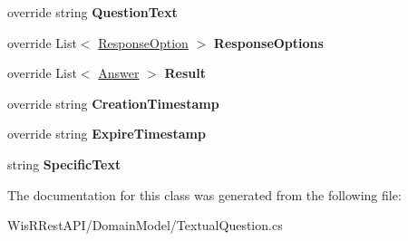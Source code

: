 \begin{DoxyCompactItemize}
\item 
\hypertarget{class_wis_r_1_1_domain_models_1_1_textual_question_ace93eb6c7a11c5a107615c642c296501}{}override string {\bfseries Question\+Text}\label{class_wis_r_1_1_domain_models_1_1_textual_question_ace93eb6c7a11c5a107615c642c296501}

\item 
\hypertarget{class_wis_r_1_1_domain_models_1_1_textual_question_a4751dd095120537c75e97a861bfb423d}{}override List$<$ \hyperlink{class_wis_r_1_1_domain_models_1_1_response_option}{Response\+Option} $>$ {\bfseries Response\+Options}\label{class_wis_r_1_1_domain_models_1_1_textual_question_a4751dd095120537c75e97a861bfb423d}

\item 
\hypertarget{class_wis_r_1_1_domain_models_1_1_textual_question_ae05acfabb4a6679dff71a53d8989b8b8}{}override List$<$ \hyperlink{class_wis_r_1_1_domain_models_1_1_answer}{Answer} $>$ {\bfseries Result}\label{class_wis_r_1_1_domain_models_1_1_textual_question_ae05acfabb4a6679dff71a53d8989b8b8}

\item 
\hypertarget{class_wis_r_1_1_domain_models_1_1_textual_question_ae1b2bf7d808750594dee9c2be3e1c529}{}override string {\bfseries Creation\+Timestamp}\label{class_wis_r_1_1_domain_models_1_1_textual_question_ae1b2bf7d808750594dee9c2be3e1c529}

\item 
\hypertarget{class_wis_r_1_1_domain_models_1_1_textual_question_a26147b2cefc4c167df129557a8181f19}{}override string {\bfseries Expire\+Timestamp}\label{class_wis_r_1_1_domain_models_1_1_textual_question_a26147b2cefc4c167df129557a8181f19}

\item 
\hypertarget{class_wis_r_1_1_domain_models_1_1_textual_question_aa75f0e132e04fc50dfa92340b9624860}{}string {\bfseries Specific\+Text}\label{class_wis_r_1_1_domain_models_1_1_textual_question_aa75f0e132e04fc50dfa92340b9624860}

\end{DoxyCompactItemize}


The documentation for this class was generated from the following file\+:\begin{DoxyCompactItemize}
\item 
Wis\+R\+Rest\+A\+P\+I/\+Domain\+Model/Textual\+Question.\+cs\end{DoxyCompactItemize}
